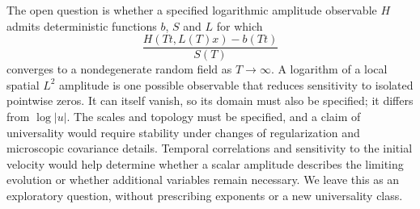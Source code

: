 The open question is whether a specified logarithmic amplitude observable
$H$ admits deterministic functions $b$, $S$ and $L$ for which
\[
  \frac{H(Tt,L(T)x)-b(Tt)}{S(T)}
\]
converges to a nondegenerate random field as $T\to\infty$. A logarithm of a
local spatial $L^2$ amplitude is one possible observable that reduces
sensitivity to isolated pointwise zeros. It can itself vanish, so its domain
must also be specified; it differs from $\log|u|$. The scales and topology must
be specified, and a claim of universality would require stability under
changes of regularization and microscopic covariance details. Temporal
correlations and sensitivity to the initial velocity would help determine
whether a scalar amplitude describes the limiting evolution or whether
additional variables remain necessary. We leave this as an exploratory
question, without prescribing exponents or a new universality class.
